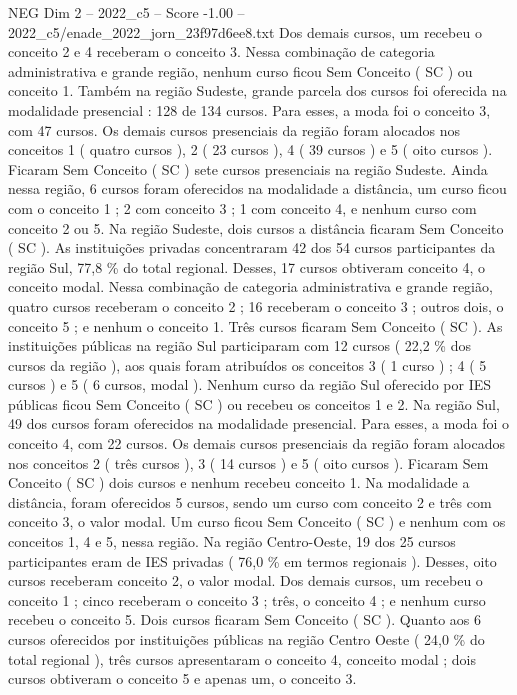 \begin{textsample}{NEG Dim 2 – 2022\_c5 – Score -1.00 – 2022\_c5/enade\_2022\_jorn\_23f97d6ee8.txt}
Dos demais cursos, um recebeu o conceito 2 e 4 receberam o conceito 3.
Nessa combinação de categoria administrativa e grande região, nenhum curso ficou Sem Conceito ( SC ) ou conceito 1.
Também na região Sudeste, grande parcela dos cursos foi oferecida na modalidade presencial : 128 de 134 cursos.
Para esses, a moda foi o conceito 3, com 47 cursos.
Os demais cursos presenciais da região foram alocados nos conceitos 1 ( quatro cursos ), 2 ( 23 cursos ), 4 ( 39 cursos ) e 5 ( oito cursos ).
Ficaram Sem Conceito ( SC ) sete cursos presenciais na região Sudeste.
Ainda nessa região, 6 cursos foram oferecidos na modalidade a distância, um curso ficou com o conceito 1 ; 2 com conceito 3 ; 1 com conceito 4, e nenhum curso com conceito 2 ou 5.
Na região Sudeste, dois cursos a distância ficaram Sem Conceito ( SC ).
As instituições privadas concentraram 42 dos 54 cursos participantes da região Sul, 77,8 \% do total regional.
Desses, 17 cursos obtiveram conceito 4, o conceito modal.
Nessa combinação de categoria administrativa e grande região, quatro cursos receberam o conceito 2 ; 16 receberam o conceito 3 ; outros dois, o conceito 5 ; e nenhum o conceito 1.
Três cursos ficaram Sem Conceito ( SC ).
As instituições públicas na região Sul participaram com 12 cursos ( 22,2 \% dos cursos da região ), aos quais foram atribuídos os conceitos 3 ( 1 curso ) ; 4 ( 5 cursos ) e 5 ( 6 cursos, modal ).
Nenhum curso da região Sul oferecido por IES públicas ficou Sem Conceito ( SC ) ou recebeu os conceitos 1 e 2.
Na região Sul, 49 dos cursos foram oferecidos na modalidade presencial.
Para esses, a moda foi o conceito 4, com 22 cursos.
Os demais cursos presenciais da região foram alocados nos conceitos 2 ( três cursos ), 3 ( 14 cursos ) e 5 ( oito cursos ).
Ficaram Sem Conceito ( SC ) dois cursos e nenhum recebeu conceito 1.
Na modalidade a distância, foram oferecidos 5 cursos, sendo um curso com conceito 2 e três com conceito 3, o valor modal.
Um curso ficou Sem Conceito ( SC ) e nenhum com os conceitos 1, 4 e 5, nessa região.
Na região Centro-Oeste, 19 dos 25 cursos participantes eram de IES privadas ( 76,0 \% em termos regionais ).
Desses, oito cursos receberam conceito 2, o valor modal.
Dos demais cursos, um recebeu o conceito 1 ; cinco receberam o conceito 3 ; três, o conceito 4 ; e nenhum curso recebeu o conceito 5.
Dois cursos ficaram Sem Conceito ( SC ).
Quanto aos 6 cursos oferecidos por instituições públicas na região Centro Oeste ( 24,0 \% do total regional ), três cursos apresentaram o conceito 4, conceito modal ; dois cursos obtiveram o conceito 5 e apenas um, o conceito 3.

\end{textsample}
